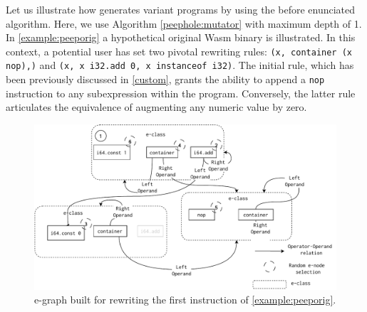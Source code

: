 

Let us illustrate how \tool generates variant programs by using the before enunciated algorithm.
Here, we use Algorithm \ref{peephole:mutator} with maximum depth of 1.
In \autoref{example:peeporig} a hypothetical original Wasm binary is illustrated.
In this context, a potential user has set two pivotal rewriting rules: \texttt{(x, container (x nop),)} and \texttt{(x, x i32.add 0, x instanceof i32)}.
The initial rule, which has been previously discussed in \autoref{custom}, grants the ability to append a \texttt{nop} instruction to any subexpression within the program. 
Conversely, the latter rule articulates the equivalence of augmenting any numeric value by zero.





\begin{figure}
    \centering
    \includegraphics[width=1.0\linewidth]{figures/e-graph-traversal2.pdf}
    \caption{e-graph built for rewriting the first instruction of \autoref{example:peeporig}. }
  \label{e-graph3}
\end{figure}



